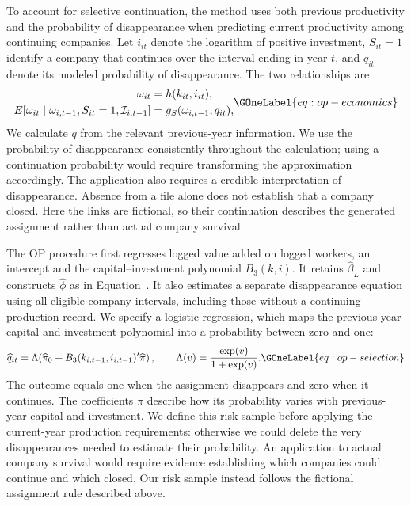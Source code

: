 To account for selective continuation, the method uses both previous productivity and the probability of disappearance when predicting current productivity among continuing companies. Let $i_{it}$ denote the logarithm of positive investment, $S_{it}=1$ identify a company that continues over the interval ending in year $t$, and $q_{it}$ denote its modeled probability of disappearance. The two relationships are
\begin{equation}
\begin{aligned}
\omega_{it}&=h(k_{it},i_{it}),\\
E[\omega_{it}\mid\omega_{i,t-1},S_{it}=1,\mathcal I_{i,t-1}]&=g_S(\omega_{i,t-1},q_{it}),
\end{aligned}
\GOneLabel{eq:op-economics}
\end{equation}
We calculate $q$ from the relevant previous-year information. We use the probability of disappearance consistently throughout the calculation; using a continuation probability would require transforming the approximation accordingly. The application also requires a credible interpretation of disappearance. Absence from a file alone does not establish that a company closed. Here the links are fictional, so their continuation describes the generated assignment rather than actual company survival.

The OP procedure first regresses logged value added on logged workers, an intercept and the capital--investment polynomial $B_3(k,i)$. It retains $\widehat\beta_L$ and constructs $\widehat\phi$ as in Equation~. It also estimates a separate disappearance equation using all eligible company intervals, including those without a continuing production record. We specify a logistic regression, which maps the previous-year capital and investment polynomial into a probability between zero and one:
\begin{equation}
\widehat q_{it}=\Lambda\!\left(\widehat\pi_0+B_3(k_{i,t-1},i_{i,t-1})'\widehat\pi\right),
\qquad \Lambda(v)=\frac{\exp(v)}{1+\exp(v)}.
\GOneLabel{eq:op-selection}
\end{equation}
The outcome equals one when the assignment disappears and zero when it continues. The coefficients $\pi$ describe how its probability varies with previous-year capital and investment. We define this risk sample before applying the current-year production requirements: otherwise we could delete the very disappearances needed to estimate their probability. An application to actual company survival would require evidence establishing which companies could continue and which closed. Our risk sample instead follows the fictional assignment rule described above.


